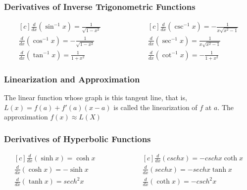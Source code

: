 \documentclass{article}
\begin{document}
\subsubsection*{Derivatives of Inverse Trigonometric Functions}
\begin{equation*}
\begin{aligned}[c]
\frac{d}{dx}(\sin^{-1} x) = \frac{1}{\sqrt{1-x^2}} 	\\
\frac{d}{dx}(\cos^{-1} x) = -\frac{1}{\sqrt{1-x^2}}	\\
\frac{d}{dx}(\tan^{-1} x) = \frac{1}{1+x^2}
\end{aligned}
\qquad\qquad\qquad
\begin{aligned}[c]
\frac{d}{dx}(\csc^{-1} x) = -\frac{1}{x \sqrt{x^2-1}} 	\\
\frac{d}{dx}(\sec^{-1} x) = \frac{1}{x \sqrt{x^2-1}}		\\
\frac{d}{dx}(\cot^{-1} x) = -\frac{1}{1+x^2}
\end{aligned}
\end{equation*}

\subsubsection*{Linearization and Approximation}
The linear function whose graph is this tangent line, that is, \(L(x)=f(a) + f'(a)(x-a)\) is called the linearization of \(f\) at \(a\). The approximation \(f(x) \approx L(X)\)

\subsubsection*{Derivatives of Hyperbolic Functions}
\begin{equation*}
\begin{aligned}[c]
\frac{d}{dx} (\sinh x) = \cosh x	\\
\frac{d}{dx} (\cosh x) = -\sinh x	\\
\frac{d}{dx} (\tanh x) = sech^2 x
\end{aligned}
\qquad\qquad\qquad
\begin{aligned}[c]
\frac{d}{dx} (csch x) = -csch x \coth x	\\
\frac{d}{dx} (sech x) = -sech x \tanh x \\
\frac{d}{dx} (\coth x) = -csch^2 x
\end{aligned}
\end{equation*}
\end{document}
